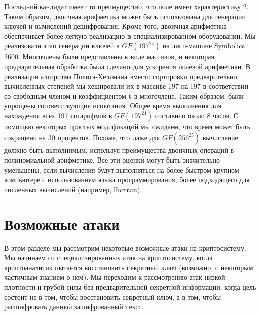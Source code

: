 \documentclass[a4paper,12pt]{article}
\newcommand{\DL}{\newline\newline}
\begin{document}
Последний кандидат имеет то преимущество, что поле имеет характеристику 2. Таким образом, двоичная арифметика может быть использована для генерации ключей и вычислений дешифрования. Кроме того, двоичная арифметика обеспечивает более легкую реализацию в специализированном оборудовании. \newline
\indent Мы реализовали этап генерации ключей в $GF(197^{24})$ на лисп-машине Symbolics 3600. Многочлены были представлены в виде массивов, и некоторая предварительная обработка была сделано для ускорения полевой арифметики. В реализации алгоритма Полига-Хеллмана вместо сортировки предварительно вычисленных степеней мы хешировали их в массиве 197 на 197 в соответствии со свободным членом и коэффициентом t в многочлене. Таким образом, были упрощены соответствующие испытания. \newline
\indent Общее время выполнения для нахождения всех 197 логарифмов в $GF(197^{24})$ составило около 8 часов. С помощью некоторых простых модификаций мы ожидаем, что время может быть сокращено на 30 процентов. Похоже, что даже для $GF(256^{25})$ вычисление должно быть выполнимым, используя преимущества двоичных операций в полиномиальной арифметике. Все эти оценки могут быть значительно уменьшены, если вычисления будут выполняться на более быстром крупном компьютере с использованием языка программирования, более подходящего для численных вычислений (например, Fortran). 
\section{Возможные атаки}

В этом разделе мы рассмотрим некоторые возможные атаки на криптосистему. Мы начинаем со специализированных атак на криптосистему, когда криптоаналитик пытается восстановить секретный ключ (возможно, с некоторым частичным знанием о нем). Мы переходим к рассмотрению атак низкой плотности и грубой силы без предварительной секретной информации, когда цель состоит не в том, чтобы восстановить секретный ключ, а в том, чтобы расшифровать данный зашифрованный текст. \DL
\end{document}
